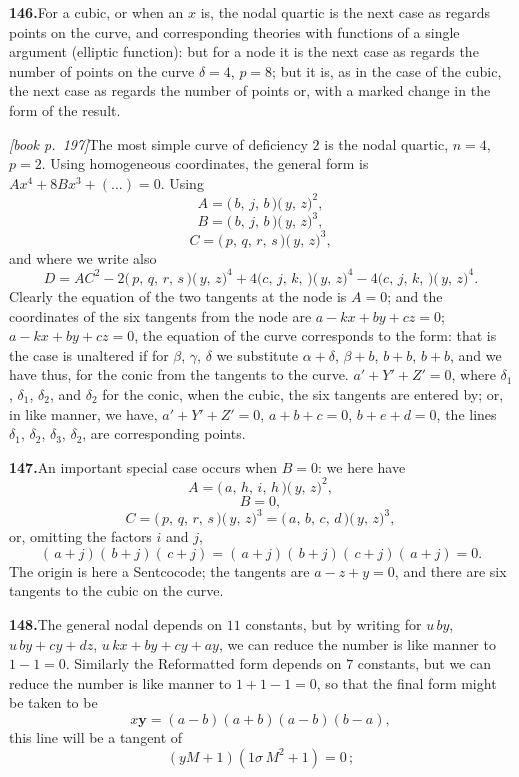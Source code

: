 \documentclass[11pt,a4paper]{article}
\begin{document}
\medskip\noindent\textbf{146.}\quad For a cubic, or when an $x$ is, the nodal quartic is the next case as regards points on the curve, and corresponding theories with functions of a single argument (elliptic function): but for a node it is the next case as regards the number of points on the curve $\delta = 4$, $p = 8$; but it is, as in the case of the cubic, the next case as regards the number of points or, with a marked change in the form of the result.

\medskip\noindent\textit{[book p.~197]}\quad The most simple curve of deficiency $2$ is the nodal quartic, $n = 4$, $p = 2$. Using homogeneous coordinates, the general form is $A x^4 + 8 B x^3 + (\ldots) = 0$. Using \[
A = \bigl(\,b,\,j,\,b\!\,\mbox{$)\!($}\,y,\,z\bigr)^2,
\]
\[
B = \bigl(\,b,\,j,\,b\!\,\mbox{$)\!($}\,y,\,z\bigr)^3,
\]
\[
C = \bigl(\,p,\,q,\,r,\,s\!\,\mbox{$)\!($}\,y,\,z\bigr)^3,
\]
and where we write also
\[
D = A C^2 - 2(\,p,\,q,\,r,\,s\!\,\mbox{$)\!($}\,y,\,z\bigr)^4 + 4(c,\,j,\,k,\!\,\mbox{$)\!($}\,y,\,z\bigr)^4 - 4(c,\,j,\,k,\!\,\mbox{$)\!($}\,y,\,z\bigr)^4.
\]
Clearly the equation of the two tangents at the node is $A = 0$; and the coordinates of the six tangents from the node are $a - kx + by + cz = 0$; $a - kx + by + cz = 0$, the equation of the curve corresponds to the form: that is the case is unaltered if for $\beta$, $\gamma$, $\delta$ we substitute $\alpha + \delta$, $\beta + b$, $b + b$, $b + b$, and we have thus, for the conic from the tangents to the curve. $a' + Y' + Z' = 0$, where $\delta_1$, $\delta_1$, $\delta_2$, and $\delta_2$ for the conic, when the cubic, the six tangents are entered by; or, in like manner, we have, $a' + Y' + Z' = 0$, $a + b + c = 0$, $b + e + d = 0$, the lines $\delta_1$, $\delta_2$, $\delta_3$, $\delta_2$, are corresponding points.

\medskip\noindent\textbf{147.}\quad An important special case occurs when $B = 0$: we here have
\[
A = \bigl(\,a,\,h,\,i,\,h\!\,\mbox{$)\!($}\,y,\,z\bigr)^2,
\]
\[
B = 0,
\]
\[
C = (\,p,\,q,\,r,\,s\!\,\mbox{$)\!($}\,y,\,z\bigr)^3 = (\,a,\,b,\,c,\,d\!\,\mbox{$)\!($}\,y,\,z\bigr)^3,
\]
or, omitting the factors $i$ and $j$,
\[
(\,a + j)(\,b + j)(\,c + j) = (\,a + j)(\,b + j)(\,c + j)(\,a + j) = 0.
\]
The origin is here a Sentcocode; the tangents are $a - z + y = 0$, and there are six tangents to the cubic on the curve.

\medskip\noindent\textbf{148.}\quad The general nodal depends on $11$ constants, but by writing for $u\,by$, $u\,by + cy + dz$, $u\,kx + by + cy + ay$, we can reduce the number is like manner to $1 - 1 = 0$. Similarly the Reformatted form depends on $7$ constants, but we can reduce the number is like manner to $1 + 1 - 1 = 0$, so that the final form might be taken to be
\[
x\bm{y} = (a - b)(a + b)(a - b)(b - a),
\]
this line will be a tangent of
\[
(yM + 1)(1\sigma\,M^2 + 1) = 0\,;
\]
\end{document}
